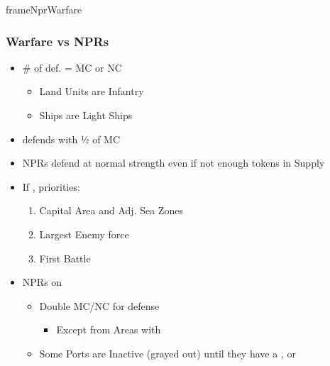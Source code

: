 \documentclass[10pt]{article}
\begin{document}
\begin{dynamiccontents*}{frameNprWarfare}
	\subsubsection*{Warfare vs NPRs }
	\begin{itemize}
		\item \# of def.  = MC or NC
		\begin{itemize}
			\item Land Units are Infantry
			\item Ships are Light Ships
		\end{itemize}
		\item {} defends with ½ of MC
		\item NPRs defend at normal strength even if not enough tokens in Supply
		\item If , priorities:
		\begin{enumerate}
			\item Capital Area and Adj. Sea Zones
			\item Largest Enemy force
			\item First Battle
		\end{enumerate}
		\item NPRs on 
		\begin{itemize}
			\item Double MC/NC for defense
			\begin{itemize}
				\item Except from Areas with \plague
			\end{itemize}
			\item Some Ports are Inactive (grayed out) until they have a \dnpr, \town or \vassal
		\end{itemize}
	\end{itemize}
\end{dynamiccontents*}
\end{document}
